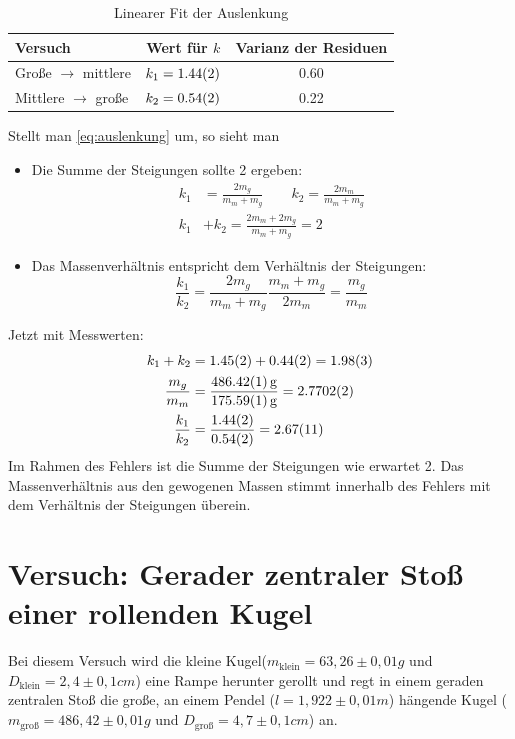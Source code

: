 \begin{table}[H]
  \centering
  \begin{tabular}{l | c | c}
    Versuch & Wert für $k$ & Varianz der Residuen \\ \hline
    Große $\rightarrow$ mittlere & $k_1=\num{1.44\pm0.02}$ & \num{0.60} \\
    Mittlere $\rightarrow$ große & $k_2=\num{.54\pm0.02}$ & \num{.22}
  \end{tabular}
  \caption{Linearer Fit der Auslenkung}
  \label{tab:pendelstossfit}
\end{table}
Stellt man \cref{eq:auslenkung} um, so sieht man 
\begin{itemize}
  \item Die Summe der Steigungen sollte 2 ergeben:
    \begin{align}
      k_1&=\frac{2m_g}{m_m+m_g} \qquad k_2=\frac{2m_m}{m_m+m_g} \\
      k_1&+k_2=\frac{2m_m+2m_g}{m_m+m_g}=2
      \label{eq:steigungssumme}
    \end{align}
  \item Das Massenverhältnis entspricht dem Verhältnis der Steigungen:
    \begin{equation}
      \frac{k_1}{k_2}=\frac{2m_g}{m_m+m_g}\frac{m_m+m_g}{2m_m}=\frac{m_g}{m_m}
      \label{eq:massenverhaeltnis}
    \end{equation}
\end{itemize}
Jetzt mit Messwerten:
\begin{align}
  k_1+k_2&=\num{1.45\pm0.02}+\num{0.44\pm0.02}=\num{1.98\pm0.03} \\
  \frac{m_g}{m_m}&=\frac{\SI{486.42\pm.01}{g}}{\SI{175.59\pm.01}{g}}=\num{2.7702\pm0.0002} \\
  \frac{k_1}{k_2}&=\frac{\num{1.44\pm0.02}}{\num{0.54\pm0.02}}=\num{2.67\pm0.11}
  \label{eq:steigungsauswertung}
\end{align}
Im Rahmen des Fehlers ist die Summe der Steigungen wie erwartet 2. Das Massenverhältnis aus den gewogenen Massen stimmt innerhalb des Fehlers mit dem Verhältnis der Steigungen überein.\\

\section{Versuch: Gerader zentraler Stoß einer rollenden Kugel}
Bei diesem Versuch wird die kleine Kugel($m_{\text{klein}}= 63,26 \pm 0,01 g $ und $D_{\text{klein}}=2,4 \pm 0,1 cm$) eine Rampe herunter gerollt und regt in einem geraden zentralen Stoß die große, an einem Pendel ($l=1,922 \pm 0,01m$) hängende Kugel ($m_{\text{groß}}=486,42 \pm 0,01g$ und $D_{\text{groß}}=4,7 \pm 0,1 cm$) an.

